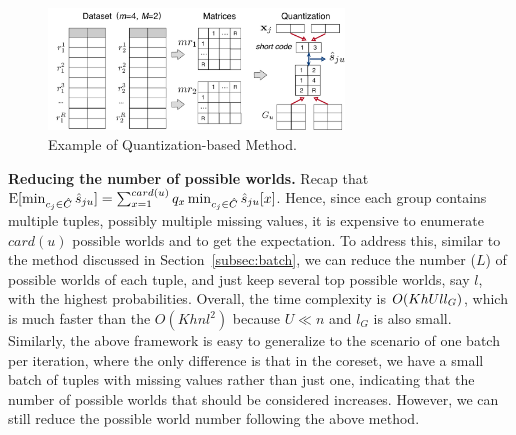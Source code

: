 \begin{figure}[t]
    \centering
    \includegraphics[width=0.7\textwidth]{figs/pq}
    \caption{Example of  Quantization-based Method.}
    \label{fig:codebook}
\end{figure}



\noindent \textbf{Reducing the number of possible worlds.} Recap that $\mathrm{E}[\min_{c_j\in \hat {C}}\hat{s}_{ju}] = \sum_{x=1}^{card(u)} q_x \min_{c_j \in \hat{C}} \hat{s}_{ju}[x]$.
%
 Hence, since each group contains multiple tuples, possibly multiple missing values,  it is expensive to enumerate $card(u)$ possible worlds and  to get the expectation. 
 To address this, similar to the method discussed in
 Section~\ref{subsec:batch},  we can reduce the number ($L$) of possible worlds of each tuple, and just keep several top possible worlds, say $l$, with the highest probabilities. 
 Overall, the time complexity is $O(KhUll_{G})$, which is much faster than the $O(Khnl^2)$ because $U \ll n$ and $l_G$ is also small. Similarly, the above framework is easy to generalize to the scenario of one batch per iteration, where the only difference is that in the coreset, we have a small batch of tuples with missing values rather than just one, indicating that the number of possible worlds that should be considered increases. However, we can still reduce the possible world number following the above method. 
 
